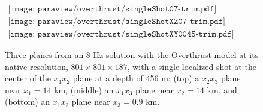 \begin{figure}
\centering
$
\begin{array}{c}
\texttt{[image: paraview/overthrust/singleShot07-trim.pdf]}\\
\texttt{[image: paraview/overthrust/singleShotXZ07-trim.pdf]}\\
\texttt{[image: paraview/overthrust/singleShotXY0045-trim.pdf]}
\end{array}
$
\caption{Three planes from an 8 Hz solution with the Overthrust model at its 
native resolution, $801 \times 801 \times 187$, with a single localized shot 
at the center of the $x_1 x_2$ plane at a depth of 456 m: 
(top) a $x_2 x_3$ plane near $x_1=14$ km, 
(middle) an $x_1 x_3$ plane near $x_2=14$ km,
and (bottom) an $x_1 x_2$ plane near $x_3=0.9$ km.}
\label{fig:overthrust-planes}
\end{figure}

%

